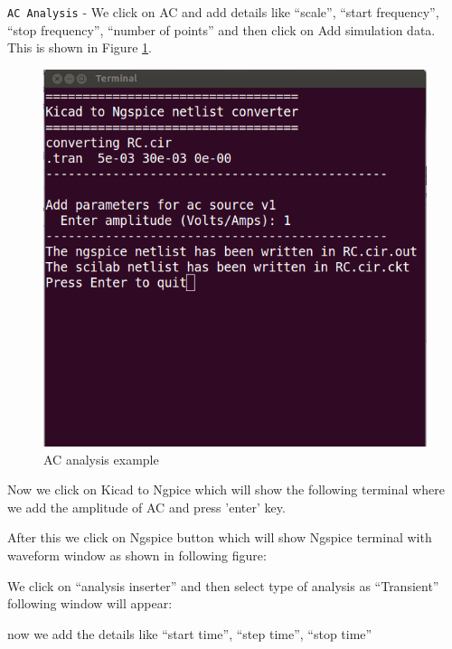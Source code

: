 {\tt AC Analysis} -  We click on AC and add details like “scale”, “start frequency”, “stop frequency”, “number of points” and then click on Add simulation data. This is shown in Figure \ref{16}.
\begin{figure}
\centering
\includegraphics[width=\textwidth]{figures/16}
\caption{AC analysis example}
\label{16}
\end{figure}
Now we click on Kicad to Ngpice which will show the following terminal where we add the amplitude of AC and press 'enter' key.

After this we click on Ngspice button which will show Ngspice terminal with waveform window as shown in following figure:

We click on “analysis inserter” and then select type of analysis as “Transient” following window will appear:

now we add the details like “start time”, “step time”, “stop time”
